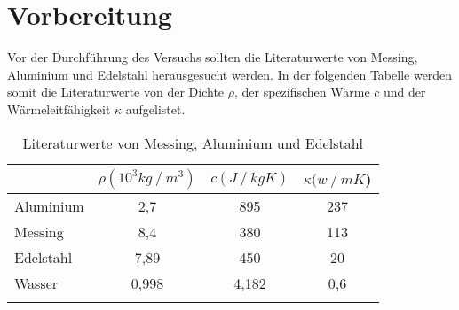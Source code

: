\section{Vorbereitung}
\label{sec:Vorbereitung}

Vor der Durchführung des Versuchs sollten die Literaturwerte von Messing, Aluminium und Edelstahl herausgesucht werden.
In der folgenden Tabelle werden somit die Literaturwerte von der Dichte $\rho$, der spezifischen Wärme $c$ und der Wärmeleitfähigkeit $\kappa$ aufgelistet.

\begin{table}
    \centering
    \caption{Literaturwerte von Messing, Aluminium und Edelstahl}
    \label{tab:Vorbereitung} 
    \begin{tabular}{
        l
        c
        c
        c
        }
    \toprule
    & {$\rho (10^3\si{kg}\mathbin{/}\si{m^3})$} &{$c (\si{J}\mathbin{/}\si{kg}\si{K})$} & {$\kappa (\si{w}\mathbin{/}\si{mK}$)} \\
    \midrule
        Aluminium & 2,7 & 895 & 237 \\
        Messing & 8,4 & 380 & 113 \\
        Edelstahl & 7,89 & 450 & 20\\
        Wasser & 0,998 & 4,182 & 0,6 \\
    \bottomrule
    \cite[378,381]{PhyPrak} \cite{EdelWäLeit} 
    \end{tabular}
\end{table}